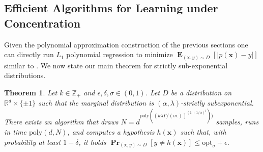 \documentclass[10pt,a4paper]{article}
\newtheorem{theorem}{Theorem}[section]
\renewcommand\vec[1]{\mathbf{#1}}
\DeclareMathOperator*{\pr}{\mathbf{Pr}}
\DeclareMathOperator*{\E}{\mathbf{E}}
\newcommand{\R}{\mathbb{R}}
\newcommand{\eps}{\epsilon}
\newcommand{\poly}{\mathrm{poly}}
\newcommand{\opt}{\mathrm{opt}}
\newcommand{\1}{\Ind}
\newcommand{\x}{\vec x}
\newcommand{\Djoint}{D}
\begin{document}
\subsection{Efficient Algorithms for Learning under Concentration}
\label{sec:efficient-algorithms}

Given the polynomial approximation construction of the previous sections one can directly
run $L_1$ polynomial regression to minimize $\E_{(\x, y)\sim D}[ |p(\x) - y|]$ similar to \cite{KKMS:05}.
We now state our main theorem for strictly sub-exponential distributions.
\begin{theorem}
\label{thm:smooth_learning_subgaussian-main}
    Let $k \in \mathbb Z_+$ and $\epsilon, \delta,\sigma \in (0,1)$.  Let $D$ be a distribution on $\R^{d}\times \{\pm 1\}$ such that the marginal distribution is $(\alpha,\lambda)$-strictly subexponential. There exists an algorithm that draws $N = d^{\poly((k\lambda\Gamma/(\sigma\epsilon))^{(1+1/\alpha)^3}))}$ samples, runs in time $\poly(d,N)$, and computes a hypothesis $h(\x)$ such that, with probability at least $1-\delta$, it holds  
    $ \pr_{(\x, y) \sim \Djoint}[y\neq h(\x)] \le \opt_\sigma + \eps  $.
\end{theorem}
\end{document}
